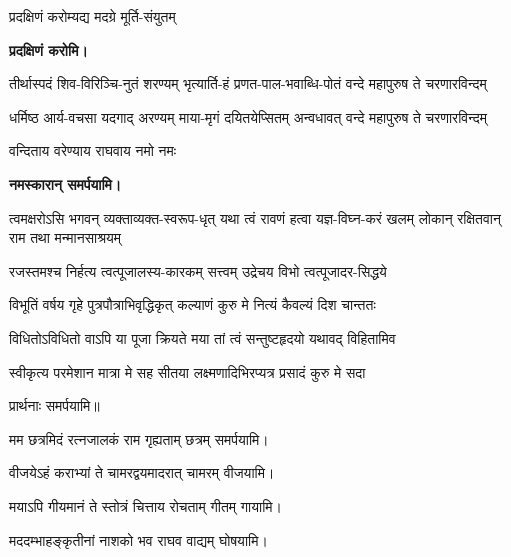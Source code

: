 \begin{center}
{प्रदक्षिणं करोम्यद्य मदग्रे मूर्ति-संयुतम्}

\textbf{\devAya{} प्रदक्षिणं करोमि।}

{तीर्थास्पदं शिव-विरिञ्चि-नुतं शरण्यम्}
{भृत्यार्ति-हं प्रणत-पाल-भवाब्धि-पोतं}
{वन्दे महापुरुष ते चरणारविन्दम्}

{धर्मिष्ठ आर्य-वचसा यदगाद् अरण्यम्}
{माया-मृगं दयितयेप्सितम् अन्वधावत्}
{वन्दे महापुरुष ते चरणारविन्दम्}

{वन्दिताय वरेण्याय राघवाय नमो नमः } 

\textbf{\devAya{} नमस्कारान् समर्पयामि।}

\resetShloka
\threelineshloka
{त्वमक्षरोऽसि भगवन् व्यक्ताव्यक्त-स्वरूप-धृत्}
{यथा त्वं रावणं हत्वा यज्ञ-विघ्न-करं खलम्}
{लोकान् रक्षितवान् राम तथा मन्मानसाश्रयम्}

\twolineshloka
{रजस्तमश्च निर्हत्य त्वत्पूजालस्य-कारकम्}
{सत्त्वम् उद्रेचय विभो त्वत्पूजादर-सिद्धये}

\twolineshloka
{विभूतिं वर्षय गृहे पुत्रपौत्राभिवृद्धिकृत्}
{कल्याणं कुरु मे नित्यं कैवल्यं दिश चान्ततः}

\twolineshloka
{विधितोऽविधितो वाऽपि या पूजा क्रियते मया}
{तां त्वं सन्तुष्टहृदयो यथावद् विहितामिव}

\twolineshloka
{स्वीकृत्य परमेशान मात्रा मे सह सीतया}
{लक्ष्मणादिभिरप्यत्र प्रसादं कुरु मे सदा}

प्रार्थनाः समर्पयामि॥

\begin{center}

\end{center}

{मम छत्रमिदं रत्नजालकं राम गृह्यताम्}
\hfill छत्रम् समर्पयामि।


{वीजयेऽहं कराभ्यां ते चामरद्वयमादरात्}
\hfill चामरम् वीजयामि।


{मयाऽपि गीयमानं ते स्तोत्रं चित्ताय रोचताम्}
\hfill गीतम् गायामि।


{मददम्भाहङ्कृतीनां नाशको भव राघव}
\hfill वाद्यम् घोषयामि।



\end{center}

